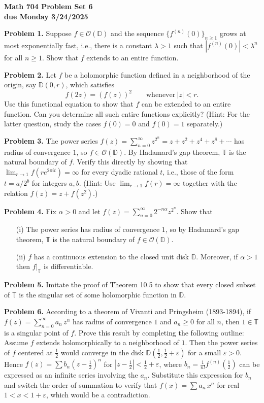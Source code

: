 \documentclass[12pt]{amsart}
\newcommand{\ve}{\varepsilon}
\newcommand{\ov}{\overline}
\newcommand{\OO}{{\mathcal O}}
\newcommand{\TT}{{\mathbb T}}
\newcommand{\DD}{{\mathbb D}}
\newcommand{\vs}{\vspace{2mm}}
\begin{document}
\begin{center}
{\bf \large Math 704 Problem Set 6} \vs \\
{\bf due Monday 3/24/2025} \vs \vs
\end{center}

\noindent
{\bf Problem 1.} Suppose $f \in \OO(\DD)$ and the sequence $\{ f^{(n)}(0) \}_{n \geq 1}$ grows at most exponentially fast, i.e., there is a constant $\lambda>1$ such that $|f^{(n)}(0)|<\lambda^n$ for all $n \geq 1$. Show that $f$ extends to an entire function. \vs

\noindent
{\bf Problem 2.} Let $f$ be a holomorphic function defined in a neighborhood of the origin, say $\DD(0,r)$, which satisfies
$$
f(2z)=(f(z))^2 \qquad \text{whenever} \ |z|<r.
$$
Use this functional equation to show that $f$ can be extended to an entire function. Can you determine all such entire functions explicitly? (Hint: For the latter question, study the cases $f(0)=0$ and $f(0)=1$ separately.) \vs

\noindent
{\bf Problem 3.} The power series $f(z)=\sum_{n=0}^{\infty} z^{2^n}=z+z^2+z^4+z^8+\cdots$ has radius of convergence $1$, so $f \in \OO(\DD)$. By Hadamard's gap theorem, $\TT$ is the natural boundary of $f$. Verify this directly by showing that $\lim_{r \to 1} f(re^{2\pi i t})=\infty$ for every dyadic rational $t$, i.e., those of the form $t=a/2^b$ for integers $a,b$. (Hint: Use $\lim_{r \to 1} f(r)=\infty$ together with the relation $f(z)=z+f(z^2)$.) \vs

\noindent
{\bf Problem 4.} Fix $\alpha>0$ and let $f(z)=\sum_{n=0}^{\infty} 2^{-n\alpha} z^{2^n}$. Show that \vs
\begin{enumerate}
\item[(i)]
The power series has radius of convergence $1$, so by Hadamard's gap theorem, $\TT$ is the natural boundary of $f \in \OO(\DD)$. \vs
\item[(ii)] 
$f$ has a continuous extension to the closed unit disk $\ov{\DD}$. Moreover, if $\alpha>1$ then $f|_\TT$ is differentiable.  
\end{enumerate}

\vs   

\noindent
{\bf Problem 5.} Imitate the proof of Theorem 10.5 to show that every closed subset of $\TT$ is the singular set of some holomorphic function in $\DD$. \vs 

\noindent
{\bf Problem 6.} According to a theorem of Vivanti and Pringsheim (1893-1894), if $f(z)=\sum_{n=0}^\infty a_n \, z^n$ has radius of convergence $1$ and $a_n \geq 0$ for all $n$, then $1 \in \TT$ is a singular point of $f$. Prove this result by completing the following outline: Assume $f$ extends holomorphically to a neighborhood of $1$. Then the power series of $f$ centered at $\tfrac{1}{2}$ would converge in the disk $\DD(\tfrac{1}{2},\tfrac{1}{2}+\ve)$ for a small $\ve>0$. Hence  $f(z)=\sum b_n (z-\tfrac{1}{2})^n$ for $|z-\tfrac{1}{2}|<\frac{1}{2}+\ve$, where $b_n=\tfrac{1}{n!} f^{(n)}(\tfrac{1}{2})$ can be expressed as an infinite series involving the $a_n$. Substitute this expression for $b_n$ and switch the order of summation to verify that $f(x)=\sum a_n \, x^n$ for real $1<x<1+\ve$, which would be a contradiction. 
\end{document}
